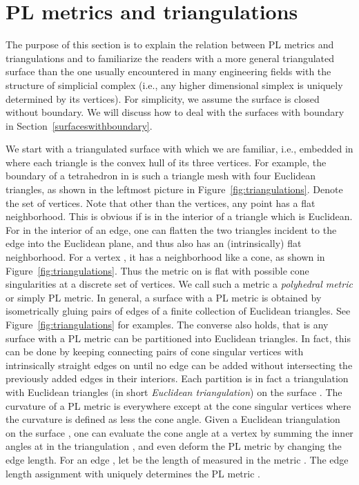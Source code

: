 \documentclass[11pt]{article}
\begin{document}
\section{PL metrics and triangulations}
The purpose of this section is to explain the relation between
PL metrics and triangulations and to familiarize the readers with a more
general triangulated surface than the one usually encountered
in many engineering fields with the structure of simplicial complex (i.e., 
any higher dimensional simplex is uniquely determined by its vertices). 
For simplicity, we assume the surface  is closed without boundary. 
We will discuss how to deal with the 
surfaces with boundary in Section~\ref{surfaceswithboundary}. 

We start with a triangulated surface  with which we are familiar, i.e., embedded in  
where each triangle is the convex hull of its three vertices. For example, the boundary of a 
tetrahedron in  is such a triangle mesh with four Euclidean 
triangles, as shown in the leftmost picture in Figure~\ref{fig:triangulations}. 
Denote  the set of vertices. 
Note that other than the vertices, any point  has a flat neighborhood. 
This is obvious if  is in the interior of a triangle which is Euclidean. 
For  in the interior of an edge, one can flatten the 
two triangles incident to the edge into the Euclidean plane, and thus  also has
an (intrinsically) flat neighborhood. For a vertex , it has a neighborhood like a 
cone, as shown in Figure~\ref{fig:triangulations}. Thus the metric on  is flat with possible
cone singularities at a discrete set of vertices. We call such a metric a {\it polyhedral metric} 
or simply  PL metric. In general, a surface with a PL metric is obtained by isometrically 
gluing pairs of edges of a finite collection of Euclidean triangles. See Figure~\ref{fig:triangulations}
for examples. The converse also holds, that is any surface with a PL metric can be 
partitioned into Euclidean triangles. In fact, this can be done by keeping connecting pairs 
of cone singular vertices with intrinsically straight edges on  until no edge can be added
without intersecting the previously added edges in their interiors. Each partition is in fact
a triangulation with Euclidean triangles (in short {\it Euclidean triangulation}) on the surface .
The curvature of a PL metric is  everywhere except at the cone singular vertices where
the curvature is defined as  less the cone angle. Given a Euclidean triangulation
 on the surface ,  one can evaluate the cone angle at a vertex  
by summing the inner angles at  in the triangulation , and even deform the PL metric  
by changing the edge length. For an edge , let  be the length of  measured in the metric 
. The edge length assignment  with  uniquely determines
the PL metric .
\end{document}
